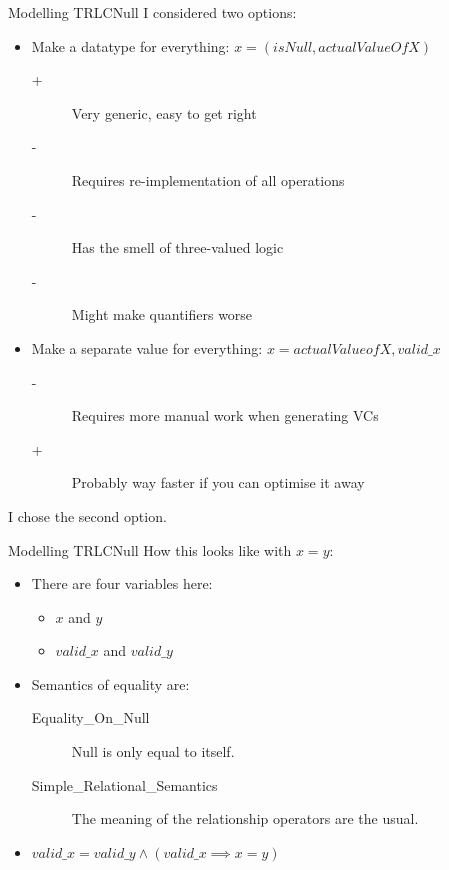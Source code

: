 \documentclass[aspectratio=169]{beamer}
\begin{document}
\begin{frame}[fragile]{Modelling TRLC}{Null}
  I considered two options:
  \begin{itemize}
  \item Make a datatype for everything: $x = (isNull, actualValueOfX)$
    \begin{description}
    \item[+] Very generic, easy to get right
    \item[-] Requires re-implementation of all operations
    \item[-] Has the smell of three-valued logic
    \item[-] Might make quantifiers worse
    \end{description}
  \item Make a separate value for everything: $x = actualValueofX, valid\_x$
    \begin{description}
    \item[-] Requires more manual work when generating VCs
    \item[+] Probably way faster if you can optimise it away
    \end{description}
  \end{itemize}
  I chose the second option.
\end{frame}

\begin{frame}{Modelling TRLC}{Null}
  How this looks like with $x = y$:\pause
  \begin{itemize}
  \item There are four variables here:
    \begin{itemize}
    \item $x$ and $y$
    \item $valid\_x$ and $valid\_y$
    \end{itemize}
    \pause
  \item Semantics of equality are:
    \begin{description}
    \item[Equality\_On\_Null] Null is only equal to itself.
    \item[Simple\_Relational\_Semantics] The meaning of the relationship
      operators are the usual.
    \end{description}
    \pause
  \item $valid\_x = valid\_y \land (valid\_x \implies x = y)$
  \end{itemize}
\end{frame}
\end{document}
